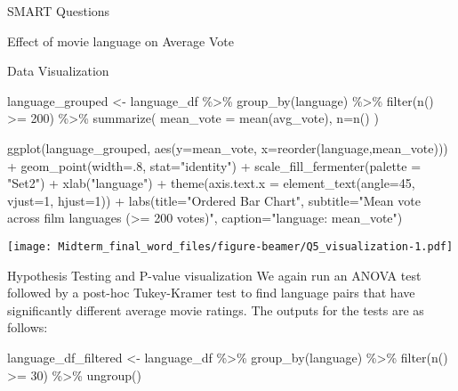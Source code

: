 \documentclass[
  ignorenonframetext,
]{beamer}
\newenvironment{Shaded}{\begin{snugshade}}{\end{snugshade}}
\newcommand{\AttributeTok}[1]{\textcolor[rgb]{0.77,0.63,0.00}{#1}}
\newcommand{\DecValTok}[1]{\textcolor[rgb]{0.00,0.00,0.81}{#1}}
\newcommand{\FunctionTok}[1]{\textcolor[rgb]{0.00,0.00,0.00}{#1}}
\newcommand{\NormalTok}[1]{#1}
\newcommand{\OtherTok}[1]{\textcolor[rgb]{0.56,0.35,0.01}{#1}}
\newcommand{\SpecialCharTok}[1]{\textcolor[rgb]{0.00,0.00,0.00}{#1}}
\newcommand{\StringTok}[1]{\textcolor[rgb]{0.31,0.60,0.02}{#1}}
\begin{document}
\begin{frame}[fragile]{SMART Questions}
\begin{block}{Effect of movie language on Average Vote}
\begin{block}{Data Visualization}
\begin{Shaded}
\begin{Highlighting}[]
\NormalTok{language\_grouped }\OtherTok{\textless{}{-}}\NormalTok{ language\_df }\SpecialCharTok{\%\textgreater{}\%}
  \FunctionTok{group\_by}\NormalTok{(language) }\SpecialCharTok{\%\textgreater{}\%}
    \FunctionTok{filter}\NormalTok{(}\FunctionTok{n}\NormalTok{() }\SpecialCharTok{\textgreater{}=} \DecValTok{200}\NormalTok{) }\SpecialCharTok{\%\textgreater{}\%}
      \FunctionTok{summarize}\NormalTok{(}
        \AttributeTok{mean\_vote =} \FunctionTok{mean}\NormalTok{(avg\_vote),}
        \AttributeTok{n=}\FunctionTok{n}\NormalTok{()}
\NormalTok{      )}

\FunctionTok{ggplot}\NormalTok{(language\_grouped, }\FunctionTok{aes}\NormalTok{(}\AttributeTok{y=}\NormalTok{mean\_vote, }\AttributeTok{x=}\FunctionTok{reorder}\NormalTok{(language,mean\_vote))) }\SpecialCharTok{+}
    \FunctionTok{geom\_point}\NormalTok{(}\AttributeTok{width=}\NormalTok{.}\DecValTok{8}\NormalTok{, }\AttributeTok{stat=}\StringTok{"identity"}\NormalTok{) }\SpecialCharTok{+}
      \FunctionTok{scale\_fill\_fermenter}\NormalTok{(}\AttributeTok{palette =} \StringTok{"Set2"}\NormalTok{) }\SpecialCharTok{+}
          \FunctionTok{xlab}\NormalTok{(}\StringTok{"language"}\NormalTok{) }\SpecialCharTok{+}
          \FunctionTok{theme}\NormalTok{(}\AttributeTok{axis.text.x =} \FunctionTok{element\_text}\NormalTok{(}\AttributeTok{angle=}\DecValTok{45}\NormalTok{, }\AttributeTok{vjust=}\DecValTok{1}\NormalTok{, }\AttributeTok{hjust=}\DecValTok{1}\NormalTok{)) }\SpecialCharTok{+}
            \FunctionTok{labs}\NormalTok{(}\AttributeTok{title=}\StringTok{"Ordered Bar Chart"}\NormalTok{,}
                \AttributeTok{subtitle=}\StringTok{"Mean vote across film languages (\textgreater{}= 200 votes)"}\NormalTok{, }
                \AttributeTok{caption=}\StringTok{"language: mean\_vote"}\NormalTok{)}
\end{Highlighting}
\end{Shaded}

\texttt{[image: Midterm\_final\_word\_files/figure-beamer/Q5\_visualization-1.pdf]}
\end{block}

\begin{block}{Hypothesis Testing and P-value visualization}
\protect\hypertarget{hypothesis-testing-and-p-value-visualization-2}{}
We again run an ANOVA test followed by a post-hoc Tukey-Kramer test to
find language pairs that have significantly different average movie
ratings. The outputs for the tests are as follows:

\begin{Shaded}
\begin{Highlighting}[]
\NormalTok{language\_df\_filtered }\OtherTok{\textless{}{-}}\NormalTok{ language\_df }\SpecialCharTok{\%\textgreater{}\%}
  \FunctionTok{group\_by}\NormalTok{(language) }\SpecialCharTok{\%\textgreater{}\%}
    \FunctionTok{filter}\NormalTok{(}\FunctionTok{n}\NormalTok{() }\SpecialCharTok{\textgreater{}=} \DecValTok{30}\NormalTok{) }\SpecialCharTok{\%\textgreater{}\%}
      \FunctionTok{ungroup}\NormalTok{()}


\end{Highlighting}
\end{Shaded}
\end{block}
\end{block}
\end{frame}
\end{document}

